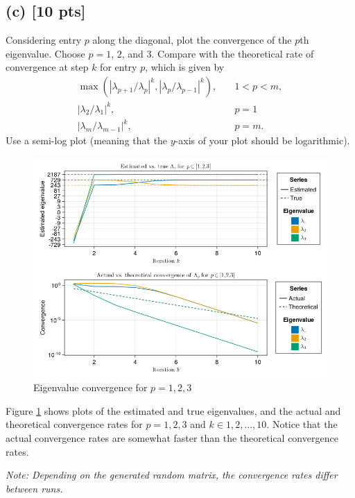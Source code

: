 \documentclass[twoside,10pt]{article}
\begin{document}
  \subsection*{(c) [10 pts]}
    Considering entry $p$ along the diagonal, plot the convergence of the $p$th eigenvalue. 
    Choose $p = 1$, $2$, and $3$.  
    Compare with the theoretical rate of convergence at step $k$ for entry $p$, which is given by 
    \begin{align}
      \max(|\lambda_{p + 1} / \lambda_p|^k, |\lambda_p / \lambda_{p -1}|^k), \quad &1 < p < m,\\
      |\lambda_2 / \lambda_1|^k, \quad &p = 1\\
      |\lambda_{m} / \lambda_{m -1}|^k, \quad &p = m.
    \end{align}
    Use a semi-log plot (meaning that the $y$-axis of your plot should be logarithmic). 

    \begin{figure}[htb]
      \begin{center}
      \includegraphics[width=\textwidth]{HW5_code/convergence_final.png}
      \end{center}
      \caption{Eigenvalue convergence for $p = 1, 2, 3$}
      \label{fig:figure1}
    \end{figure}
    \quad Figure \ref{fig:figure1} shows plots of the estimated and true eigenvalues, and the actual and theoretical convergence rates for $p = 1, 2, 3$ and $k \in 1, 2, \dots, 10$.
    Notice that the actual convergence rates are somewhat faster than the theoretical convergence rates.

    \textit{Note: Depending on the generated random matrix, the convergence rates differ between runs.}
    \clearpage
\end{document}
